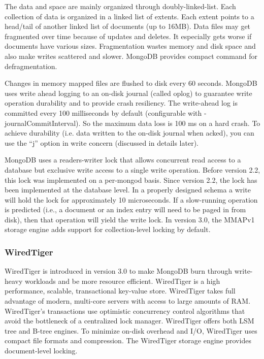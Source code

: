 \documentclass[11pt]{book}
\begin{document}
The data and space are mainly organized through doubly-linked-list. Each collection of data is organized in a linked list of extents. Each extent points to a head/tail of another linked list of documents (up to 16MB). Data files may get fragmented over time because of updates and deletes. It especially gets worse if documents have various sizes. Fragmentation wastes memory and disk space and also make writes scattered and slower. MongoDB provides compact command for defragmentation.

Changes in memory mapped files are flushed to disk every 60 seconds. MongoDB uses write ahead logging to an on-disk journal (called oplog) to guarantee write operation durability and to provide crash resiliency. The write-ahead log is committed every 100 milliseconds by default (configurable with -journalCommitInterval). So the maximum data loss is 100 ms on a hard crash. To achieve durability (i.e. data written to the on-disk journal when acked), you can use the ``j'' option in write concern (discussed in details later).

MongoDB uses a readers-writer lock that allows concurrent read access to a database but exclusive write access to a single write operation. Before version 2.2, this lock was implemented on a per-mongod basis. Since version 2.2, the lock has been implemented at the database level. In a properly designed schema a write will hold the lock for approximately 10 microseconds. If a slow-running operation is predicted (i.e., a document or an index entry will need to be paged in from disk), then that operation will yield the write lock. In version 3.0, the MMAPv1 storage engine adds support for collection-level locking by default.

\subsubsection{WiredTiger}
WiredTiger \cite{WiredTiger} is introduced in version 3.0 to make MongoDB burn through write-heavy workloads and be more resource efficient.
WiredTiger is a high performance, scalable, transactional key-value store. WiredTiger takes full advantage of modern, multi-core servers with access to large amounts of RAM. WiredTiger's transactions use optimistic concurrency control algorithms that avoid the bottleneck of a centralized lock manager. WiredTiger offers both LSM tree and B-tree engines. To minimize on-disk overhead and I/O, WiredTiger uses compact file formats and compression.
The WiredTiger storage engine provides document-level locking.
\end{document}
